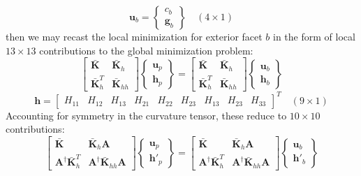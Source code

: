 \documentclass[11pt]{article} %
\begin{document}
\begin{equation}
	\mathbf{u}_b = \left\{ \begin{array}{c} c_b \\ \mathbf{g}_b \end{array} \right\} \quad (4 \times 1)
\end{equation}
then we may recast the local minimization for exterior facet $b$ in the form of local $13\times13$ contributions to the global minimization problem:
\begin{equation}
	\left[ \begin{array}{cc} \bar{\mathbf{K}} & \bar{\mathbf{K}}_{h} \\ \bar{\mathbf{K}}^T_{h} & \bar{\mathbf{K}}_{hh} \end{array} \right] \left\{ \begin{array}{c} \mathbf{u}_p \\ \mathbf{h}_{p} \end{array} \right\} = \left[ \begin{array}{cc} \bar{\mathbf{K}} & \bar{\mathbf{K}}_{h} \\ \bar{\mathbf{K}}^T_{h} & \bar{\mathbf{K}}_{hh} \end{array} \right] \left\{ \begin{array}{c} \mathbf{u}_b \\ \mathbf{h}_{b} \end{array} \right\}
\end{equation}
\begin{equation}
	\mathbf{h} =  \left[ \begin{array}{ccccccccc} H_{11} & H_{12} & H_{13} & H_{21} & H_{22} & H_{23} & H_{13} & H_{23} & H_{33} \end{array} \right]^T \quad (9 \times 1)
\end{equation}
Accounting for symmetry in the curvature tensor, these reduce to $10\times10$ contributions:
\begin{equation}
	\left[ \begin{array}{cc} \bar{\mathbf{K}} & \bar{\mathbf{K}}_{h} \mathbf{A} \\ \mathbf{A}^{\dagger} \bar{\mathbf{K}}^T_{h} & \mathbf{A}^{\dagger} \bar{\mathbf{K}}_{hh} \mathbf{A} \end{array} \right] \left\{ \begin{array}{c} \mathbf{u}_p \\ \mathbf{h}'_{p} \end{array} \right\} = \left[ \begin{array}{cc} \bar{\mathbf{K}} & \bar{\mathbf{K}}_{h} \mathbf{A} \\ \mathbf{A}^{\dagger} \bar{\mathbf{K}}^T_{h} & \mathbf{A}^{\dagger} \bar{\mathbf{K}}_{hh} \mathbf{A} \end{array} \right] \left\{ \begin{array}{c} \mathbf{u}_b \\ \mathbf{h}'_{b} \end{array} \right\}
\end{equation}
\end{document}
